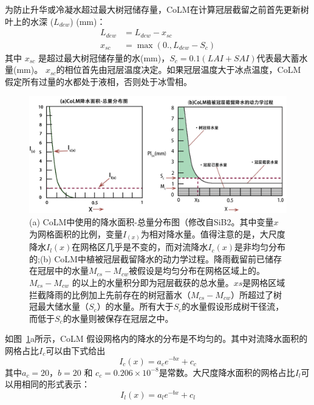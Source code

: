 为防止升华或冷凝水超过最大树冠储存量，CoLM在计算冠层截留之前首先更新树叶上的水深 ($L_{dew}$) (mm)：
\begin{equation}
\begin{aligned}
L_{dew} &= L_{dew}-x_{sc} \\
x_{s c} &= \max \left(0., L_{dew}-S_{c}\right)
\end{aligned}
\end{equation}
其中 $x_{sc}$ 是超过最大树冠储存量的水(mm)，$S_c=0.1\left(LAI+SAI\right)$代表最大蓄水量(mm)。
$x_{sc}$的相位首先由冠层温度决定。如果冠层温度大于冰点温度，CoLM 假定所有过量的水都处于液相，否则处于冰雪相。

{
\begin{figure}[htbp]
\centering
\includegraphics[scale=0.75]{Figures/植被冠层和土壤水分/CoLM冠层截留示意图.png}
\caption{(a) CoLM中使用的降水面积-总量分布图（修改自SiB2。其中变量$x$为网格面积的比例，变量$I_{\left(x\right)}$为相对降水量。值得注意的是，大尺度降水$I_l\left(x\right)$在网格区几乎是不变的，而对流降水$I_c\left(x\right)$是非均匀分布的;(b) CoLM中植被冠层截留降水的动力学过程。降雨截留前已储存在冠层中的水量$M_{cs}-M_{cw}$被假设是均匀分布在网格区域上的。$M_{cs}-M_{cw}$ 的以上的水量积分即为冠层截获的总水量。$xs$是网格区域拦截降雨的比例加上先前存在的树冠蓄水（$M_{cs}-M_{cw}$）所超过了树冠最大储水量（$S_c$）的水量。所有大于$S_c$的水量假设形成树干径流，而低于$S_c$的水量则被保存在冠层之中。}
\label{fig:CoLM冠层截留示意图}
\end{figure}
}
如图~\ref{fig:CoLM冠层截留示意图}a所示，CoLM 假设网格内的降水的分布是不均匀的。其中对流降水面积的网格占比$I_c$可以由下式给出
\begin{equation}
I_{c}(x)=a_{c} e^{-bx}+c_{c}
\end{equation}
其中$a_c=20$，$b=20$ 和 $c_c=0.206\times10^{-8}$是常数。大尺度降水面积的网格占比$I_l$可以用相同的形式表示：
\begin{equation}
I_{l}(x)=a_{l} e^{-b x}+c_{l}
\end{equation}
